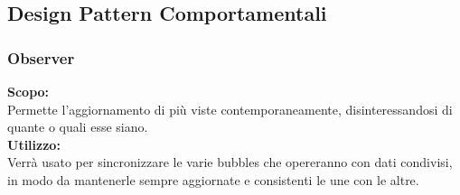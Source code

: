 \subsection{Design Pattern Comportamentali}

\subsubsection{Observer}
\textbf{Scopo:} \\
Permette l'aggiornamento di più viste contemporaneamente, disinteressandosi di quante o quali esse siano.\\
\textbf{Utilizzo:} \\
Verrà usato per sincronizzare le varie bubbles che opereranno con dati condivisi, in modo da mantenerle sempre aggiornate e consistenti le une con le altre.